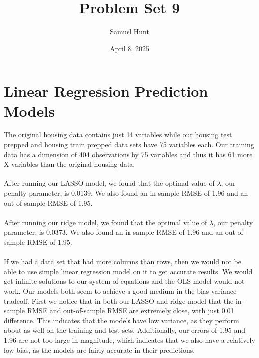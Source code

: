 \documentclass{article}
\title{Problem Set 9}
\author{Samuel Hunt}
\date{April 8, 2025}
\begin{document}
\maketitle  %

\section{Linear Regression Prediction Models}
The original housing data contains just 14 variables while our housing test prepped and housing train prepped data sets have 75 variables each.
Our training data has a dimension of 404 observations by 75 variables and thus it has 61 more X variables than the original housing data.
\\
\\After running our LASSO model, we found that the optimal value of $\lambda$, our penalty parameter, is 0.0139. We also found an in-sample RMSE of 1.96 and an out-of-sample RMSE of 1.95.
\\
\\After running our ridge model, we found that the optimal value of $\lambda$, our penalty parameter, is 0.0373. We also found an in-sample RMSE of 1.96 and an out-of-sample RMSE of 1.95.
\\
\\If we had a data set that had more columns than rows, then we would not be able to use simple linear regression model on it to get accurate results. We would get infinite solutions to our system of equations and the OLS model would not work. Our models both seem to achieve a good medium in the bias-variance tradeoff. First we notice that in both our LASSO and ridge model that the in-sample RMSE and out-of-sample RMSE are extremely close, with just 0.01 difference. This indicates that the models have low variance, as they perform about as well on the training and test sets. Additionally, our errors of 1.95 and 1.96 are not too large in magnitude, which indicates that we also have a relatively low bias, as the models are fairly accurate in their predictions.
\end{document}
